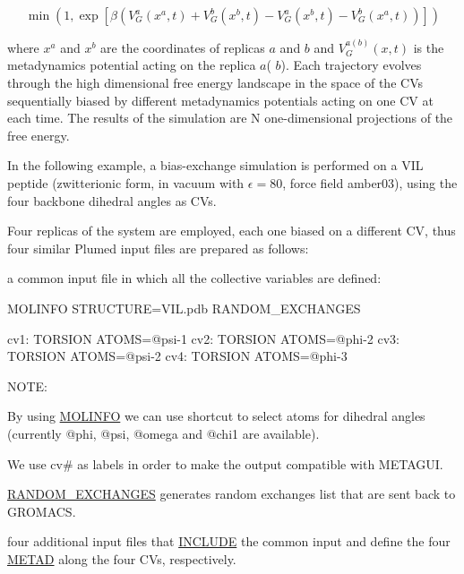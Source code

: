 \[ \min\left( 1, \exp \left[ \beta ( V_G^a(x^a,t)+V_G^b(x^b,t)-V_G^a(x^b,t)-V_G^b(x^a,t) ) \right] \right) \]

where $ x^{a} $ and $ x^{b} $ are the coordinates of replicas $a $ and $ b $ and $ V_{G}^{a(b)}\left(x,t\right) $ is the metadynamics potential acting on the replica $ a $( $ b $). Each trajectory evolves through the high dimensional free energy landscape in the space of the C\+Vs sequentially biased by different metadynamics potentials acting on one C\+V at each time. The results of the simulation are N one-\/dimensional projections of the free energy.

In the following example, a bias-\/exchange simulation is performed on a V\+I\+L peptide (zwitterionic form, in vacuum with $ \epsilon=80 $, force field amber03), using the four backbone dihedral angles as C\+Vs.

Four replicas of the system are employed, each one biased on a different C\+V, thus four similar Plumed input files are prepared as follows\+:


\begin{DoxyItemize}
\item a common input file in which all the collective variables are defined\+:
\end{DoxyItemize}

\begin{DoxyVerb}MOLINFO STRUCTURE=VIL.pdb
RANDOM_EXCHANGES

cv1: TORSION ATOMS=@psi-1
cv2: TORSION ATOMS=@phi-2
cv3: TORSION ATOMS=@psi-2
cv4: TORSION ATOMS=@phi-3
\end{DoxyVerb}


N\+O\+T\+E\+:
\begin{DoxyEnumerate}
\item By using \hyperlink{MOLINFO}{M\+O\+L\+I\+N\+F\+O} we can use shortcut to select atoms for dihedral angles (currently @phi, @psi, @omega and @chi1 are available).
\item We use cv\# as labels in order to make the output compatible with M\+E\+T\+A\+G\+U\+I.
\item \hyperlink{RANDOM_EXCHANGES}{R\+A\+N\+D\+O\+M\+\_\+\+E\+X\+C\+H\+A\+N\+G\+E\+S} generates random exchanges list that are sent back to G\+R\+O\+M\+A\+C\+S.
\end{DoxyEnumerate}
\begin{DoxyItemize}
\item four additional input files that \hyperlink{INCLUDE}{I\+N\+C\+L\+U\+D\+E} the common input and define the four \hyperlink{METAD}{M\+E\+T\+A\+D} along the four C\+Vs, respectively.
\end{DoxyItemize}

